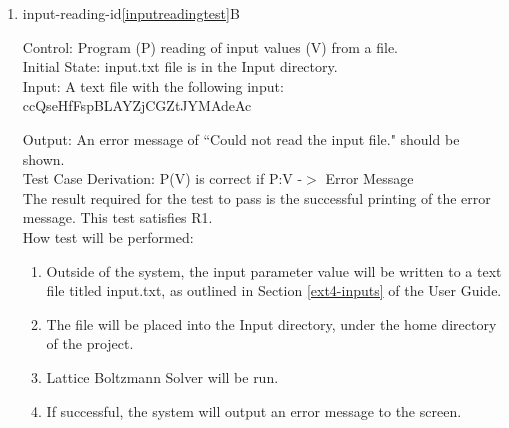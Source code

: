 \documentclass[12pt, titlepage]{article}
\newcommand{\famname}{Lattice Boltzmann Solver}
\begin{document}
\begin{enumerate}
Test Case Derivation: P(V) is correct if P:V -$>$ O and O = V\\

The result required for the test to pass is the successful printing of all input
values to the screen. This test satisfies R1.\\
					
How test will be performed: 

\begin{enumerate}
\item Outside of the system, the input parameter values will be written to a text file titled input.txt, as outlined in Section \ref{ext4-inputs} of the User Guide.
\item The file will be placed into the Input directory, under the home directory
  of the project.
\item The input reading module will be modified to print the input data prior to verifying it.  
\item {\famname} will be run.
\item If successful, The system will output the input parameters to the screen.
\end{enumerate}

\item{input-reading-id\ref{inputreadingtest}B\\}

Control: Program (P) reading of input values (V) from a file.\\

Initial State: input.txt file is in the Input directory.\\

Input: A text file with the following input:\\
ccQseHfFspBLAYZjCGZtJYMAdeAc

Output: An error message of ``Could not read the input file." should be shown.\\

Test Case Derivation: P(V) is correct if P:V -$>$ Error Message \\

The result required for the test to pass is the successful printing of the error message. This test satisfies R1.\\

How test will be performed: 

\begin{enumerate}
\item Outside of the system, the input parameter value will be written to a text file titled input.txt, as outlined in Section \ref{ext4-inputs} of the User Guide.
\item The file will be placed into the Input directory, under the home directory
  of the project.
\item {\famname} will be run.
\item If successful, the system will output an error message to the screen.
\end{enumerate}

\end{enumerate}
			
\end{document}
